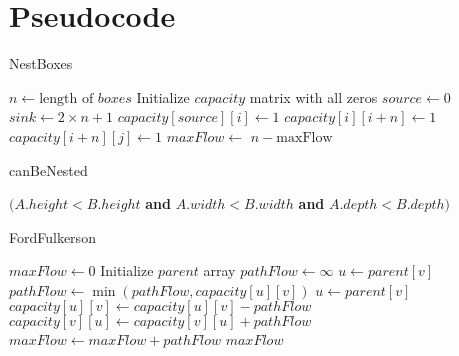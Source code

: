 \documentclass{article}
\begin{document}
\section{Pseudocode}
\begin{algorithm}
\caption{NestBoxes}
\begin{algorithmic}[1]
    \State $n \gets \text{length of } boxes$
    \State Initialize $capacity$ matrix with all zeros
    \State $source \gets 0$
    \State $sink \gets 2 \times n + 1$
        \State $capacity[source][i] \gets 1$
        \State $capacity[i][i + n] \gets 1$
                \State $capacity[i + n][j] \gets 1$
            \EndIf
        \EndFor
    \EndFor
    \State $maxFlow \gets$ 
    \State \Return $n - \text{maxFlow}$
\EndFunction
\end{algorithmic}
\end{algorithm}

\begin{algorithm}
\caption{canBeNested}
\begin{algorithmic}[1]
    \State \Return $(A.height < B.height$ \textbf{and} $A.width < B.width$ \textbf{and} $A.depth < B.depth)$
\EndFunction
\end{algorithmic}
\end{algorithm}

\begin{algorithm}
\caption{FordFulkerson}
\begin{algorithmic}[1]
    \State $maxFlow \gets 0$
    \State Initialize $parent$ array
        \State $pathFlow \gets \infty$
            \State $u \gets parent[v]$
            \State $pathFlow \gets \min(pathFlow, capacity[u][v])$
        \EndFor
            \State $u \gets parent[v]$
            \State $capacity[u][v] \gets capacity[u][v] - pathFlow$
            \State $capacity[v][u] \gets capacity[v][u] + pathFlow$
        \EndFor
        \State $maxFlow \gets maxFlow + pathFlow$
    \EndWhile
    \State \Return $maxFlow$
\EndFunction
\end{algorithmic}
\end{algorithm}
\end{document}
